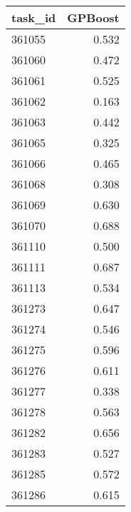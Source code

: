 \begin{tabular}{lr}
\toprule
task\_id & GPBoost \\
\midrule
361055 & 0.532 \\
361060 & 0.472 \\
361061 & 0.525 \\
361062 & 0.163 \\
361063 & 0.442 \\
361065 & 0.325 \\
361066 & 0.465 \\
361068 & 0.308 \\
361069 & 0.630 \\
361070 & 0.688 \\
361110 & 0.500 \\
361111 & 0.687 \\
361113 & 0.534 \\
361273 & 0.647 \\
361274 & 0.546 \\
361275 & 0.596 \\
361276 & 0.611 \\
361277 & 0.338 \\
361278 & 0.563 \\
361282 & 0.656 \\
361283 & 0.527 \\
361285 & 0.572 \\
361286 & 0.615 \\
\bottomrule
\end{tabular}
